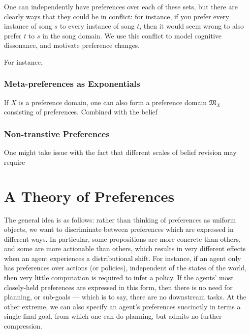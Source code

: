 \documentclass{book}
\begin{document}
	One can independently have preferences over each of these sets, but there are clearly ways that they could be in conflict: for instance, if you prefer every instance of song $s$ to every instance of song $t$, then it would seem wrong to also prefer $t$ to $s$ in the song domain.  We use this conflict to model cognitive dissonance, and motivate preference changes.
	
	For instance, 
	
	\subsection{Meta-preferences as Exponentials}
	If $X$ is a preference domain, one can also form a preference domain $\mathfrak M_X$ consisting of preferences. Combined with the belief 
	
	
	\subsection{Non-transtive Preferences}
	One might take issue with the fact that different scales of belief revision may require
	

	\chapter{A Theory of Preferences}
	
	The general idea is as follows: rather than thinking of preferences as uniform objects, we want to discriminate between preferences which are expressed in different ways. In particular, some propositions are more concrete than others, and some are more actionable than others, which results in very different effects when an agent experiences a distributional shift. For instance, if an agent only has preferences over actions (or policies), independent of the states of the world, then very little computation is required to infer a policy. If the agents' most closely-held preferences are expressed in this form, then there is no need for planning, or sub-goals --- which is to say, there are no downstream tasks. At the other extreme, we can also specify an agent's preferences succinctly in terms a single final goal, from which one can do planning, but admits no further compression.
	
\end{document}
